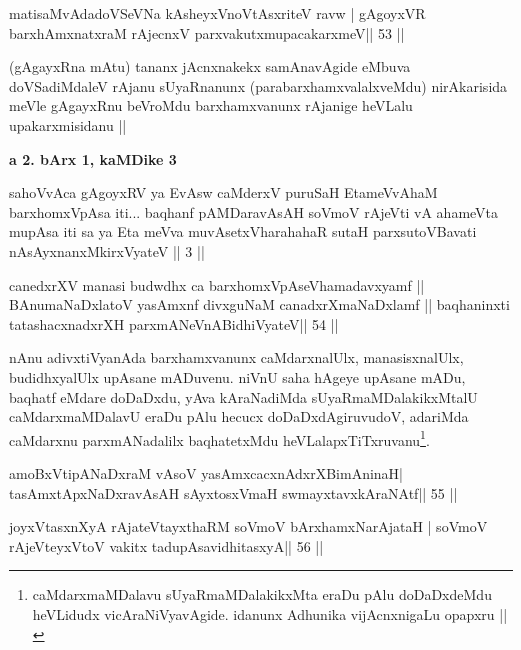 \begin{shl}
matisaMvAdadoVSeVNa kAsheyxVnoVtAsxriteV ravw |
gAgoyxVR barxhAmxnatxraM rAjecnxV parxvakutxmupacakarxmeV\hfill || 53 ||
\end{shl}

\begin{artha}
(gAgayxRna mAtu) tananx jAcnxnakekx samAnavAgide  eMbuva doVSadiMdaleV rAjanu sUyaRnanunx (parabarxhamxvalalxveMdu) nirAkarisida meVle gAgayxRnu beVroMdu barxhamxvanunx rAjanige heVLalu upakarxmisidanu ||
\end{artha} 

\begin{center}
{\large\bf a 2. bArx 1, kaMDike 3}
\end{center}

\begin{shl}
sahoVvAca gAgoyxRV ya EvAsw caMderxV puruSaH
EtameVvAhaM barxhomxVpAsa iti...
baqhanf pAMDaravAsAH soVmoV rAjeVti
vA ahameVta mupAsa iti sa ya Eta meVva
muvAsetxV\s harahahaR sutaH parxsutoVBavati
nAsAyxnanxMkirxVyateV || 3 ||
\end{shl}


\begin{shl}
canedxrXV manasi budwdhx ca barxhomxVpAseV\s hamadavxyamf ||
BAnumaNaDxlatoV yasAmxnf divxguNaM canadxrXmaNaDxlamf ||
baqhaninxti tatashacxnadxrXH parxmANeVnABidhiVyateV\hfill || 54 ||
\end{shl}

\begin{artha}
nAnu adivxtiVyanAda barxhamxvanunx caMdarxnalUlx, manasisxnalUlx,  budidhxyalUlx upAsane mADuvenu. niVnU saha hAgeye upAsane mADu,  baqhatf eMdare doDaDxdu, yAva kAraNadiMda sUyaRmaMDalakikxMtalU caMdarxmaMDalavU eraDu pAlu hecucx doDaDxdAgiruvudoV, adariMda caMdarxnu parxmANadalilx baqhatetxMdu heVLalapxTiTxruvanu\footnote[8]{caMdarxmaMDalavu sUyaRmaMDalakikxMta eraDu pAlu doDaDxdeMdu heVLidudx vicAraNiVyavAgide. idanunx Adhunika vijAcnxnigaLu opapxru ||}.
\end{artha}

\begin{shl}
amoBxV\s tipANaDxraM vAsoV yasAmxcacxnAdxrXBimAninaH|
tasAmxtApxNaDxravAsAH sAyxtosxVmaH swmayxtavxkAraNAtf\hfill || 55 ||
\end{shl}

\begin{shl}
joyxVtasxnXyA rAjateV\s tayxthaRM soVmoV bArxhamxNarAjataH |
soVmoV rAjeVteyxVtoV vakitx tadupAsavidhitasxyA\hfill || 56 ||
\end{shl}

